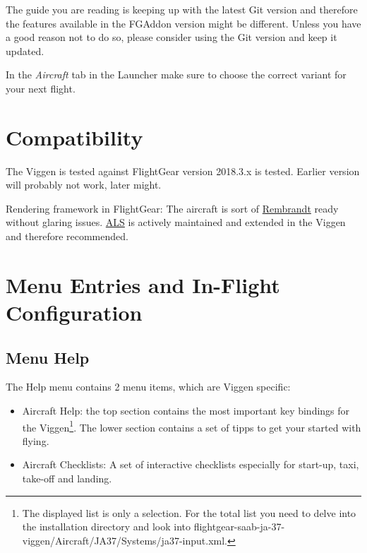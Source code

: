 The guide you are reading is keeping up with the latest Git version and therefore the features available in the FGAddon version might be different. Unless you have a good reason not to do so, please consider using the Git version and keep it updated.

In the \emph{Aircraft} tab in the Launcher make sure to choose the correct variant for your next flight.

\section{Compatibility}
The Viggen is tested against FlightGear version 2018.3.x is tested. Earlier version will probably not work, later might.

Rendering framework in FlightGear: The aircraft is sort of \href{http://wiki.flightgear.org/Project_Rembrandt}{Rembrandt} ready without glaring issues. \href{http://wiki.flightgear.org/Atmospheric_light_scattering}{ALS} is actively maintained and extended in the Viggen and therefore recommended.

\section{Menu Entries and In-Flight Configuration}
\subsection{Menu Help}
The Help menu contains 2 menu items, which are Viggen specific:
\begin{itemize}
\item Aircraft Help: the top section contains the most important key bindings for the Viggen\footnote{The displayed list is only a selection. For the total list you need to delve into the installation directory and look into flightgear-saab-ja-37-viggen/Aircraft/JA37/Systems/ja37-input.xml.}. The lower section contains a set of tipps to get your started with flying.
\item Aircraft Checklists: A set of interactive checklists especially for start-up, taxi, take-off and landing.
\end{itemize}

